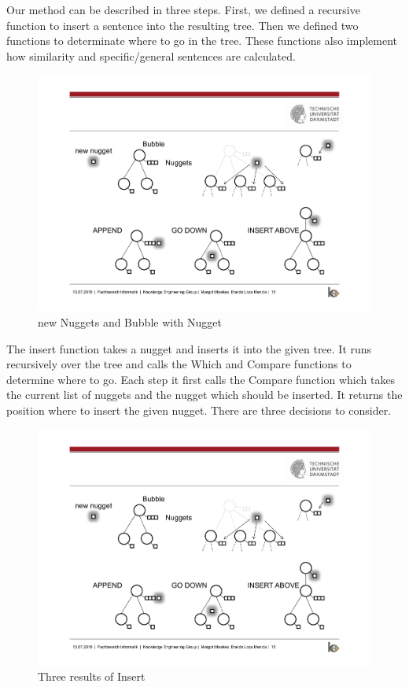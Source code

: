 
Our method can be described in three steps. First, we defined a recursive function to insert a sentence into the resulting tree. Then we defined two functions to determinate where to go in the tree. These functions also implement how similarity and specific/general sentences are calculated.

\begin{figure}[H]
	\centering
	\includegraphics[trim=3cm 10cm 15cm 5.8cm, clip=true]{img/step2_func.pdf}
	\caption{new Nuggets and Bubble with Nugget}
	\label{fig:nuggetbubble}
\end{figure}

The insert function takes a nugget and inserts it into the given tree. It runs recursively over the tree and calls the Which and Compare functions to determine where to go. Each step it first calls the Compare function which takes the current list of nuggets and the nugget which should be inserted. It returns the position where to insert the given nugget. There are three decisions to consider.
\begin{figure}[H]
	\centering
	\includegraphics[trim=3.5cm 3cm 3cm 11cm, clip=true, width= \textwidth]{img/step2_func.pdf}
	\caption{Three results of Insert}
	\label{fig:insert}
\end{figure}

